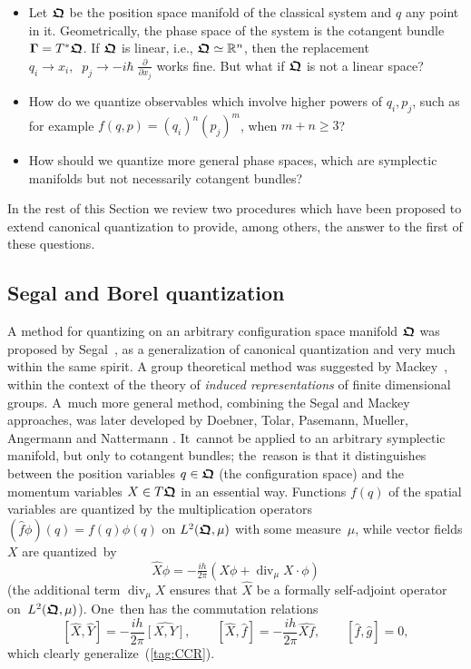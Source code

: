 \documentclass[11pt]{amsart}
\numberwithin{equation}{section}
\theoremstyle{remark}
\newcommand\XX{{\bfrakQ}}
\newcommand{\bigam}{\mbox{\boldmath $\Gamma$}}
\newcommand{\bfrakQ}{\mbox{\boldmath $\mathfrak Q$}}
\begin{document}
\begin{itemize}

\item  Let $\bfrakQ$ be the position space manifold of the classical
system and $q$ any point in it. Geometrically, the phase space of the system
is the cotangent bundle $\bigam = T^{*}\bfrakQ$.
 If $\bfrakQ$ is linear, i.e., $\bfrakQ
\simeq {\mathbb R}^n$, then the replacement $q_i \rightarrow x_i,
\;\;
p_{j} \rightarrow -i\hbar\;{\displaystyle\frac {\partial}{\partial x_j}}$
works fine. But what if $\bfrakQ$ is not a linear space?

\item How do we quantize observables which involve higher powers
of $q_i, p_{j}$, such as for example $f(q,p) = (q_i)^{n}(p_{j})^{m}$,
when $m+n \geq 3$?

\item How should we  quantize more general phase spaces, which are symplectic
manifolds but not necessarily cotangent bundles?

\end{itemize}

In the rest of this  Section we review two procedures which have been proposed
to extend  canonical quantization to provide, among others, the answer to the
first of these questions.


\subsection{Segal and Borel quantization}
\label{sec-segborelquant}

A method for quantizing on an arbitrary configuration space manifold $\bfrakQ$
was proposed by Segal~\cite{bib:Segal}, as a generalization of canonical
quantization and very much within the same spirit. A group theoretical method
was suggested by Mackey~\cite{bib:Mack}, within the context of the theory of
{\it induced representations} of finite dimensional groups. A~much more general
method, combining the Segal and Mackey approaches, was later developed by
Doebner, Tolar, Pasemann, Mueller, Angermann and Nattermann \cite{bib:-doebtol,
bib:DoebNa,bib:-nattermann}. It~cannot be applied to an arbitrary symplectic
manifold, but only to cotangent bundles; the~reason is that it distinguishes
between the position variables $q\in\XX$ (the configuration space) and the
momentum variables $X\in T \XX$ in an essential way. Functions $f(q)$ of the
spatial variables are quantized by the multiplication operators
$(\widehat f \phi)(q) =f(q) \phi(q)$ on $L^2(\XX,\mu)$ with some measure~$\mu$,
while vector fields $X$ are quantized~by
$$ \widehat X \phi = -\tfrac{ih}{2\pi}
  (X\phi + \operatorname{div}_\mu X\cdot\phi)  $$
(the additional term $\operatorname{div}_\mu X$ ensures that $\widehat X$
be a formally self-adjoint operator on~$L^2(\XX,\mu)$). One~then has the
commutation relations
$$ [\widehat X,\widehat Y]=-\frac{ih}{2\pi} \widehat {[X,Y]},
\qquad [\widehat X,\widehat f]=-\frac{ih}{2\pi} \widehat {Xf},
\qquad [\widehat f,\widehat g]=0,  $$
which clearly generalize~(\ref{tag:CCR}).
\end{document}
